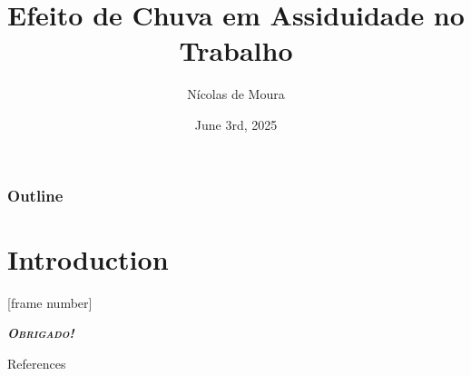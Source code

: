 \documentclass[compress,sans,12pt,aspectratio=169]{beamer}
\title{\textbf{Efeito de Chuva em Assiduidade no Trabalho}}
\date{June 3rd, 2025}
\author{Nícolas de Moura \inst{\textdagger}}
\institute{\inst{\textdagger} Escola de Economia de São Paulo - FGV/EESP}
\newcommand{\textdest}[1]{\textbf{\textit{\textsc{#1}}}}
\begin{document}
\frame[plain]{\titlepage}

    \begin{frame}[plain]
        \frametitle{Outline}
        \tableofcontents
    \end{frame}

    \section{Introduction}
    


\End

[frame number]


\begin{frame}
      \centering\LARGE{\textdest{Obrigado!}}
\end{frame}


\begin{frame}[allowframebreaks]{References}
    
\end{frame}
\end{document}
